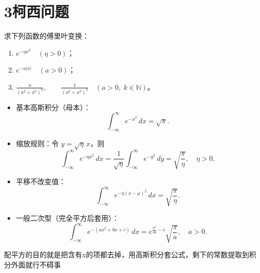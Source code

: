 \section{3柯西问题}

\begin{homework}[1]
求下列函数的傅里叶变换：
\begin{enumerate}[(1)]
  \item $e^{-\eta x^2}\quad(\eta>0)$；
  \item $e^{-a|x|}\quad(a>0)$；
  \item $\displaystyle\frac{x}{(a^2+x^2)^k},\qquad
        \frac1{(a^2+x^2)^k}\quad(a>0,\;k\in\mathbb N)$。
\end{enumerate}
\end{homework}
\begin{dxtips}
    \begin{itemize}
  \item 基本高斯积分（母本）：
  \[
    \int_{-\infty}^{\infty} e^{-x^2}\,dx = \sqrt{\pi}.
  \]
  \item 缩放规则：令 $y=\sqrt{\eta}\,x$，则
  \[
    \int_{-\infty}^{\infty} e^{-\eta x^2}\,dx
      = \frac{1}{\sqrt{\eta}}
        \int_{-\infty}^{\infty} e^{-y^2}\,dy
      = \sqrt{\frac{\pi}{\eta}},\quad \eta>0.
  \]
  \item 平移不改变值：
  \[
    \int_{-\infty}^{\infty} e^{-\eta (x-\mu)^2}\,dx
    = \sqrt{\frac{\pi}{\eta}}.
  \]
  \item 一般二次型（完全平方后套用）：
  \[
    \int_{-\infty}^{\infty} e^{-(ax^2+bx+c)}\,dx
    = e^{\frac{b^2}{4a}-c}\sqrt{\frac{\pi}{a}},\quad a>0.
  \]
\end{itemize}
\end{dxtips}
\begin{note}
    配平方的目的就是把含有x的项都去掉，用高斯积分套公式，剩下的常数提取到积分外面就行不碍事
\end{note}

